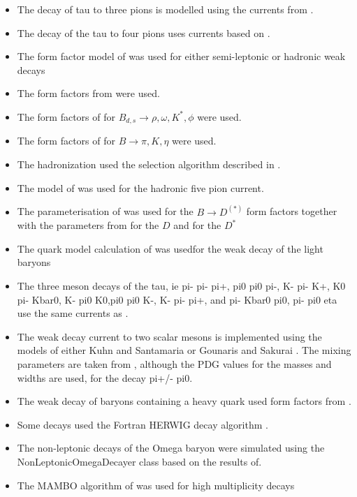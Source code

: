 \documentclass{article}
\begin{document}
\begin{itemize}
\item The decay of tau to three pions is modelled using the currents from \cite{Asner:1999kj}.
\item The decay of the tau to four pions uses currents based on \cite{Bondar:2002mw}.
\item The form factor model of \cite{Bauer:1986bm,Wirbel:1985ji} was used for either semi-leptonic or hadronic weak decays
\item The form factors from \cite{Ivanov:1996fj} were used.
\item The form factors of \cite{Ball:2004rg} for $B_{d,s}\to\rho,\omega,K^*,\phi$ were used.
\item The form factors of \cite{Ball:2004ye} for $B\to\pi, K, \eta$ were used.
\item The hadronization used the selection algorithm described in \cite{Kupco:1998fx}.
\item The model of \cite{Kuhn:2006nw} was used for the hadronic five pion current.
\item The parameterisation of \cite{Caprini:1997mu} was used for the $B\to D^{(*)}$ form factors together with the parameters from\cite{Snyder:2007qn} for the $D$ and \cite{Aubert:2007rs} for the $D^*$
\item The quark model calculation of \cite{Schlumpf:1994fb} was usedfor the weak decay of the light baryons
\item The three meson decays of the tau, ie pi- pi- pi+, pi0 pi0 pi-, K- pi- K+, K0 pi- Kbar0, K- pi0 K0,pi0 pi0 K-, K- pi- pi+, and pi- Kbar0 pi0, pi- pi0 eta use the same currents as \cite{Jadach:1993hs,Kuhn:1990ad,Decker:1992kj}.
\item The weak decay current to two scalar mesons is implemented using the models of either Kuhn and Santamaria \cite{Kuhn:1990ad} or Gounaris and Sakurai \cite{Gounaris:1968mw}. The mixing parameters are taken from \cite{Asner:1999kj}, although the PDG values for the masses and widths are used, for the decay pi+/- pi0.
\item The weak decay of baryons containing a heavy quark used form factors from \cite{Cheng:1995fe,Cheng:1996cs}.
\item Some decays used the Fortran HERWIG decay algorithm \cite{Corcella:2000bw}.
\item The  non-leptonic decays of the Omega baryon were simulated using the NonLeptonicOmegaDecayer class based on the results of\cite{Borasoy:1999ip}.
\item The MAMBO algorithm of \cite{Kleiss:1991rn} was used for high multiplicity decays

\end{itemize}
\end{document}
